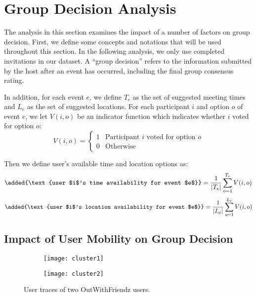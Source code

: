 \section{Group Decision Analysis} 
\label{sec:analysis}  
The analysis in this section examines the impact of a number of factors on 
group decision. First, we define some concepts and notations that will be used throughout this section. In the 
following analysis, we only use completed invitations in our dataset. A ``group
decision'' refers to the information submitted by the host after an event has
occurred, including the final group consensus rating.

In addition, for each event $e$, we define $T_e$ as the set of suggested meeting
times and $L_e$ as the set of suggested locations. For each participant $i$ and
option $o$ of event $e$, we let $V(i, o)$ be an indicator function which
indicates whether $i$ voted for option $o$:
\begin{equation}
V(i, o) = \left\{ \begin{array}{rcl}
1 & \mbox{Participant $i$ voted for option $o$} \\ 0 & \mbox{Otherwise} 
\end{array}\right.
\end{equation}

Then we define user's available time and location options as:
\begin{equation}
\label{time_avail}
\added{\text{user $i$'s time availability for event $e$}} = \frac{1}{|T_e|}\sum_{o = 1}^{T_e}V(i, o)
\end{equation}
\begin{equation}
\label{loc_avail}
\added{\text{user $i$'s location availability for event $e$}} = \frac{1}{|L_e|}\sum_{o = 1}^{L_e}V(i, o)
\end{equation}


\newtheorem{observation}{Observation}
\subsection{Impact of User Mobility on Group Decision}
\label{sec:impact-user-mobility}
\begin{figure}
\centering
\begin{subfigure}{.5\textwidth}
  \centering
  \texttt{[image: cluster1]}
  \label{fig:cluster1}
\end{subfigure}%
\begin{subfigure}{.5\textwidth}
  \centering
  \texttt{[image: cluster2]}
  \label{fig:cluster2}
\end{subfigure}
\caption{User traces of two OutWithFriendz users. }
\label{fig:cluster}
\end{figure}

